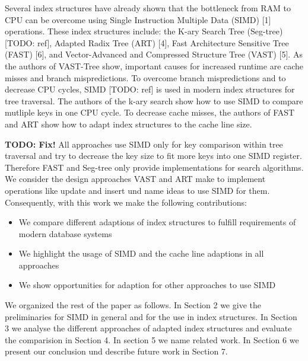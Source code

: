 \documentclass[conference]{IEEEtran}
\begin{document}
Several index structures have already shown that the bottleneck from RAM to CPU can be overcome using Single Instruction Multiple Data (SIMD) [1] operations. These index structures include: the K-ary Search Tree (Seg-tree) [TODO: ref], Adapted Radix Tree (ART) [4], Fast Architecture Sensitive Tree (FAST) [6], and Vector-Advanced and Compressed Structure Tree (VAST) [5]. As the authors of VAST-Tree show, important causes for increased runtime are cache misses and branch mispredictions. To overcome branch mispredictions and to decrease CPU cycles, SIMD [TODO: ref] is used in modern index structures for tree traversal. The authors of the k-ary search show how to use SIMD to compare mutliple keys in one CPU cycle. To decrease cache misses, the authors of FAST and ART show how to adapt index structures to the cache line size.  

\textbf{TODO: Fix!} All approaches use SIMD only for key comparison within tree traversal and try to decrease the key size to fit more keys into one SIMD register. Therefore FAST and Seg-tree only provide implementations for search algorithms. We consider the design approaches VAST and ART make to implement operations like update and insert und name ideas to use SIMD for them. Consequently, with this work we make the following contributions:
\begin{itemize}
	\item We compare different adaptions of index structures to fulfill requirements of modern database systems
	\item We highlight the usage of SIMD and the cache line adaptions in all approaches
	\item We show opportunities for adaption for other approaches to use SIMD
\end{itemize}
We organized the rest of the paper as follows. In Section 2 we give the preliminaries for SIMD in general and for the use in index structures. In Section 3 we analyse the different approaches of adapted index structures and evaluate the comparision in Section 4. In section 5 we name related work. In Section 6 we present our conclusion und describe future work in Section 7. 
\end{document}
